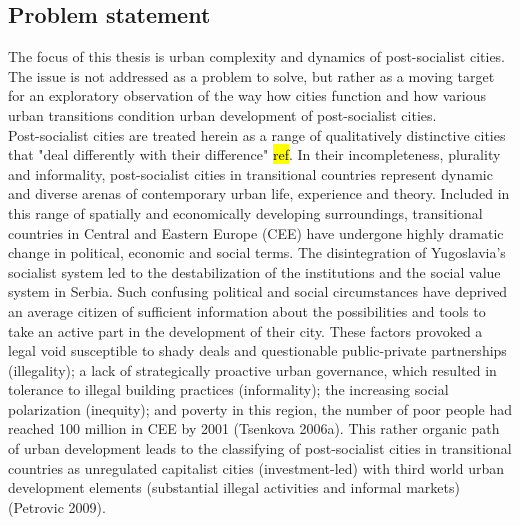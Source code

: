 \documentclass[11pt]{report}
\begin{document}
\subsection{Problem statement}
The focus of this thesis is urban complexity and dynamics of post-socialist cities. The issue is not addressed as a problem to solve, but rather as a moving target for an exploratory observation of the way how cities function and how various urban transitions condition urban development of post-socialist cities.
\\
Post-socialist cities are treated herein as a range of qualitatively distinctive cities that "deal differently with their difference" \hl{ref}. In their incompleteness, plurality and informality, post-socialist cities in transitional countries represent dynamic and diverse arenas of contemporary urban life, experience and theory. Included in this range of spatially and economically developing surroundings, transitional countries in Central and Eastern Europe (CEE) have undergone highly dramatic change in political, economic and social terms. The disintegration of Yugoslavia’s socialist system led to the destabilization of the institutions and the social value system in Serbia. Such confusing political and social circumstances have deprived an average citizen of sufficient information about the possibilities and tools to take an active part in the development of their city. These factors provoked a legal void susceptible to shady deals and questionable public-private partnerships (illegality); a lack of strategically proactive urban governance, which resulted in tolerance to illegal building practices (informality); the increasing social polarization (inequity); and poverty in this region, the number of poor people had reached 100 million in CEE by 2001 (Tsenkova 2006a). This rather organic path of urban development leads to the classifying of post-socialist cities in transitional countries as unregulated capitalist cities (investment-led) with third world urban development elements (substantial illegal activities and informal markets) (Petrovic 2009).
\\
\end{document}
